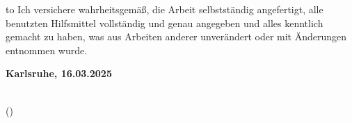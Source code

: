 
\thispagestyle{empty}
\null\vfill
\noindent\hbox to \textwidth{\hrulefill} 
%
{Ich versichere wahrheitsgemäß, die Arbeit
selbstständig angefertigt, alle benutzten Hilfsmittel vollständig und genau
angegeben und alles kenntlich gemacht zu haben, was aus Arbeiten anderer
unverändert oder mit Änderungen entnommen wurde.}
 
 
\textbf{Karlsruhe, 16.03.2025}
\vspace{1.5cm}
 
\dotfill\hspace*{6.0cm}\\
\hspace*{1cm}(\theauthor) 
\cleardoublepage